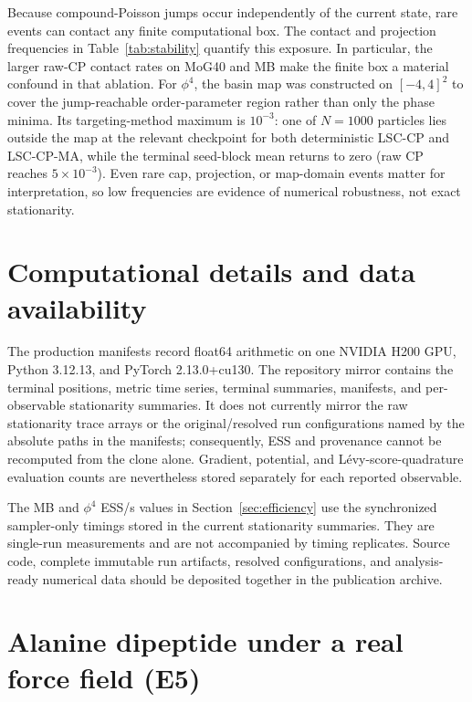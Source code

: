 \documentclass[11pt]{article}
\begin{document}
Because compound-Poisson jumps occur independently of the current state, rare
events can contact any finite computational box.  The contact and projection
frequencies in Table~\ref{tab:stability} quantify this exposure.  In
particular, the larger raw-CP contact rates on MoG40 and MB make the finite box
a material confound in that ablation.  For $\phi^4$, the basin map was
constructed on $[-4,4]^2$ to cover the jump-reachable order-parameter region
rather than only the phase minima.  Its targeting-method maximum is
$10^{-3}$: one of $N=1000$ particles lies outside the map at the relevant
checkpoint for both deterministic LSC-CP and LSC-CP-MA, while the terminal
seed-block mean returns to zero (raw CP reaches $5\times10^{-3}$).  Even rare cap,
projection, or map-domain events matter for interpretation, so low frequencies
are evidence of numerical robustness, not exact stationarity.

\section{Computational details and data availability}
\label{app:computational}

The production manifests record float64 arithmetic on one NVIDIA H200 GPU,
Python 3.12.13, and PyTorch 2.13.0+cu130.  The repository mirror contains the
terminal positions, metric time series, terminal summaries, manifests, and
per-observable stationarity summaries.  It does not currently mirror the raw
stationarity trace arrays or the original/resolved run configurations named by
the absolute paths in the manifests; consequently, ESS and provenance cannot
be recomputed from the clone alone.  Gradient, potential, and
L\'evy-score-quadrature evaluation counts are nevertheless stored separately
for each reported observable.

The MB and $\phi^4$ ESS/s values in Section~\ref{sec:efficiency} use the
synchronized sampler-only timings stored in the current stationarity
summaries.  They are single-run measurements and are not accompanied by timing
replicates.  Source code, complete immutable run artifacts, resolved
configurations, and analysis-ready numerical data should be deposited together
in the publication archive.

\section{Alanine dipeptide under a real force field (E5)}
\label{app:alanine}
\end{document}
